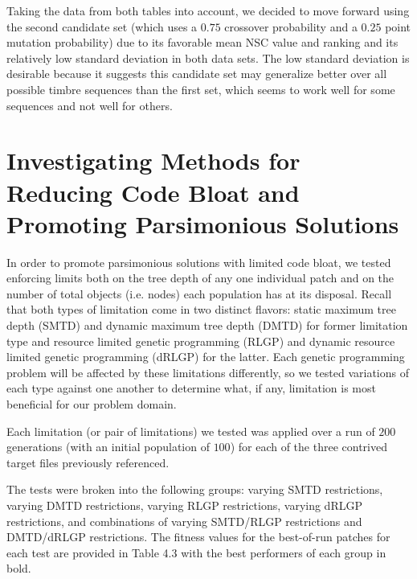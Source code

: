 \documentclass[a4paper,12pt]{report} 	%
\numberwithin{figure}{chapter}
\numberwithin{table}{chapter}
\numberwithin{equation}{chapter}
\begin{document}
\begin{flushleft}
Taking the data from both tables into account, we decided to move forward using the second candidate set (which uses a $0.75$ crossover probability and a $0.25$ point mutation probability) due to its favorable mean NSC value and ranking and its relatively low standard deviation in both data sets. The low standard deviation is desirable because it suggests this candidate set may generalize better over all possible timbre sequences than the first set, which seems to work well for some sequences and not well for others.

\section{Investigating Methods for Reducing Code Bloat and Promoting Parsimonious Solutions}
In order to promote parsimonious solutions with limited code bloat, we tested enforcing limits both on the tree depth of any one individual patch and on the number of total objects (i.e. nodes) each population has at its disposal. Recall that both types of limitation come in two distinct flavors: static maximum tree depth (SMTD) and dynamic maximum tree depth (DMTD) for former limitation type and resource limited genetic programming (RLGP) and dynamic resource limited genetic programming (dRLGP) for the latter. Each genetic programming problem will be affected by these limitations differently, so we tested variations of each type against one another to determine what, if any, limitation is most beneficial for our problem domain. 

Each limitation (or pair of limitations) we tested was applied over a run of $200$ generations (with an initial population of $100$) for each of the three contrived target files previously referenced.

The tests were broken into the following groups: varying SMTD restrictions, varying DMTD restrictions, varying RLGP restrictions, varying dRLGP restrictions, and combinations of varying SMTD/RLGP restrictions and DMTD/dRLGP restrictions. The fitness values for the best-of-run patches for each test are provided in Table 4.3 with the best performers of each group in bold.


\end{flushleft}
\end{document}
